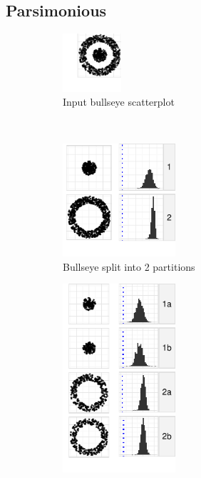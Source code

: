 \subsection{Parsimonious}
  \begin{figure}[t]
    \centering
    \begin{minipage}[b]{1.7in}
       \begin{subfigure}[b]{\linewidth}
        \centering
  	\includegraphics[width=0.85in]{images/donut1-donut2.pdf}
        \vspace{-0.5cm}
      \caption{Input bullseye scatterplot}
      \label{fig:pars1}
      \end{subfigure}\\[\baselineskip]
      \begin{subfigure}[b]{\linewidth}
  	\includegraphics[width=1.65in]{images/19_5065416601259-cluster.pdf}
        \vspace{-0.5cm}
      \caption{Bullseye split into 2 partitions}
        \vspace{0.25cm}
      \label{fig:pars2}
      \end{subfigure}
      \begin{subfigure}[b]{\linewidth}
  	\includegraphics[width=1.65in]{images/9_27395081160431-cluster1.pdf}

\end{subfigure}
\end{minipage}
\end{figure}
